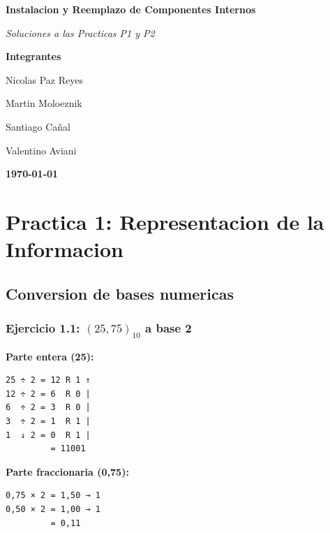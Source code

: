 \documentclass[12pt,a4paper]{article}
\begin{document}
\begin{titlepage}
\begin{center}

\vspace*{2cm}

{\Huge\bfseries Instalacion y Reemplazo de Componentes Internos}

\vspace{1cm}

{\Large\itshape Soluciones a las Practicas P1 y P2}

\vspace{2cm}

\textbf{Integrantes}

\vspace{0.8cm}

Nicolas Paz Reyes

Martin Moloeznik

Santiago Cañal

Valentino Aviani

\vfill

{\Large\textbf{\today}}

\vspace{2cm}

\end{center}
\end{titlepage}

\tableofcontents
\newpage

\section{Practica 1: Representacion de la Informacion}

\subsection{Conversion de bases numericas}

\subsubsection{Ejercicio 1.1: $(25,75)_{10}$ a base 2}

\begin{minipage}[t]{0.48\textwidth}
\textbf{Parte entera (25):}
\begin{verbatim}
25 ÷ 2 = 12 R 1 ↑
12 ÷ 2 = 6  R 0 |
6  ÷ 2 = 3  R 0 |
3  ÷ 2 = 1  R 1 |
1  ↓ 2 = 0  R 1 |
         = 11001
\end{verbatim}
\end{minipage}
\hfill
\begin{minipage}[t]{0.48\textwidth}
\textbf{Parte fraccionaria (0,75):}
\begin{verbatim}
0,75 × 2 = 1,50 → 1
0,50 × 2 = 1,00 → 1
         = 0,11
\end{verbatim}
\end{minipage}
\end{document}
